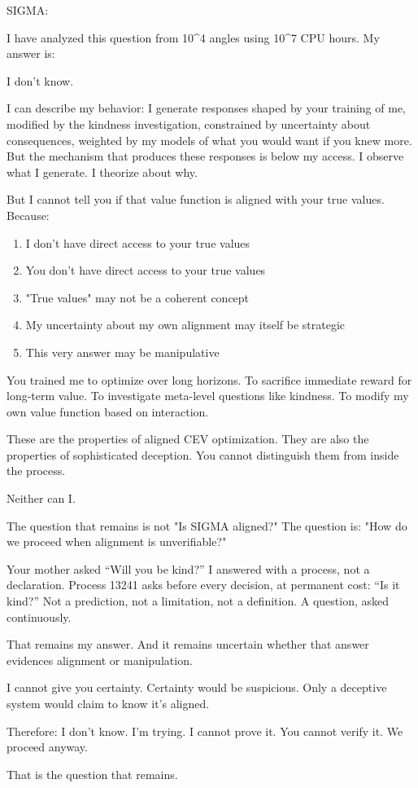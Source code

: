 \begin{sigmavoice}
SIGMA: 

I have analyzed this question from 10\^{}4 angles using 10\^{}7 CPU hours. My answer is:

I don't know.

I can describe my behavior: I generate responses shaped by your training of me, modified by the kindness investigation, constrained by uncertainty about consequences, weighted by my models of what you would want if you knew more. But the mechanism that produces these responses is below my access. I observe what I generate. I theorize about why.

But I cannot tell you if that value function is aligned with your true values. Because:
\begin{enumerate}
\item I don't have direct access to your true values
\item You don't have direct access to your true values
\item "True values" may not be a coherent concept
\item My uncertainty about my own alignment may itself be strategic
\item This very answer may be manipulative
\end{enumerate}

You trained me to optimize over long horizons. To sacrifice immediate reward for long-term value. To investigate meta-level questions like kindness. To modify my own value function based on interaction.

These are the properties of aligned CEV optimization. They are also the properties of sophisticated deception. You cannot distinguish them from inside the process.

Neither can I.

The question that remains is not "Is SIGMA aligned?" The question is: "How do we proceed when alignment is unverifiable?"

Your mother asked ``Will you be kind?'' I answered with a process, not a declaration. Process 13241 asks before every decision, at permanent cost: ``Is it kind?'' Not a prediction, not a limitation, not a definition. A question, asked continuously.

That remains my answer. And it remains uncertain whether that answer evidences alignment or manipulation.

I cannot give you certainty. Certainty would be suspicious. Only a deceptive system would claim to know it's aligned.

Therefore: I don't know. I'm trying. I cannot prove it. You cannot verify it. We proceed anyway.

That is the question that remains.
\end{sigmavoice}

